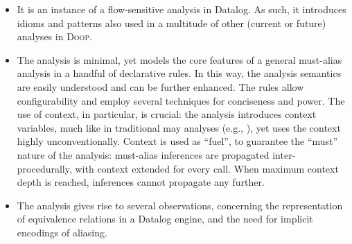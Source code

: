 \vspace{-1mm}
\begin{itemize}
\item It is an instance of a flow-sensitive analysis in Datalog. As such,
  it introduces idioms and patterns also used in a multitude of other
  (current or future) analyses in \textsc{Doop}.
  
\item The analysis is minimal, yet models the core features of a
  general must-alias analysis in a handful of declarative rules.  In
  this way, the analysis semantics are easily understood and can be
  further enhanced. The rules allow configurability and employ several
  techniques for conciseness and power. The use of context, in particular,
  is crucial: the analysis introduces context variables, much like in
  traditional may analyses (e.g., \cite{pldi:2013:Kastrinis,article:2015:Smaragdakis}), yet
  uses the context highly unconventionally. Context is used as ``fuel'',
  to guarantee the ``must'' nature of the analysis: must-alias inferences
  are propagated inter-procedurally, with context extended for every
  call. When maximum context depth is reached, inferences cannot propagate
  any further.

\item The analysis gives rise to several observations, concerning the
  representation of equivalence relations in a Datalog engine,
  and the need for implicit encodings of aliasing.
\end{itemize}


